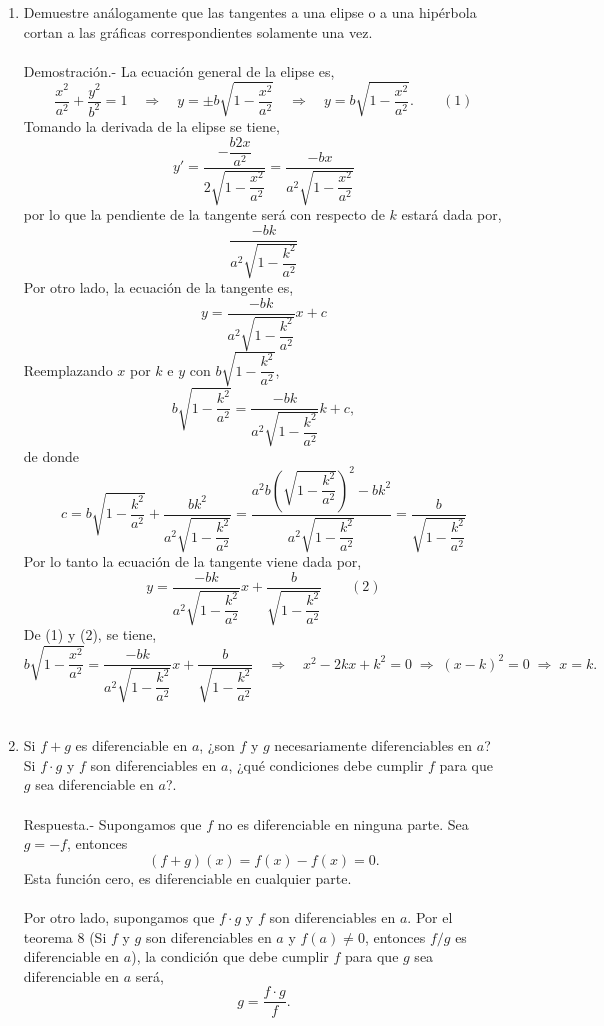 \begin{enumerate}[\bfseries 1.]
     \item Demuestre análogamente que las tangentes a una elipse o a una hipérbola cortan a las gráficas correspondientes solamente una vez.\\\\
	 Demostración.-\; La ecuación general de la elipse es,
	 $$\dfrac{x^2}{a^2}+\dfrac{y^2}{b^2}=1 \quad \Rightarrow \quad y=\pm b \sqrt{1-\dfrac{x^2}{a^2}} \quad \Rightarrow \quad y= b \sqrt{1-\dfrac{x^2}{a^2}}.\qquad (1)$$
	 Tomando la derivada de la elipse se tiene,
	 $$y'=\dfrac{-\dfrac{b2x}{a^2}}{2\sqrt{1-\dfrac{x^2}{a^2}}}=\dfrac{-bx}{a^2\sqrt{1-\dfrac{x^2}{a^2}}}$$
	 por lo que la pendiente de la tangente será con respecto de $k$ estará dada por,
	 $$\dfrac{-bk}{a^2\sqrt{1-\dfrac{k^2}{a^2}}}$$
	 Por otro lado, la ecuación de la tangente es,
	 $$y=\dfrac{-bk}{a^2\sqrt{1-\dfrac{k^2}{a^2}}}x+c$$
	 Reemplazando $x$ por $k$ e $y$ con $b\sqrt{1-\dfrac{k^2}{a^2}}$,
	 $$b\sqrt{1-\dfrac{k^2}{a^2}}=\dfrac{-bk}{a^2\sqrt{1-\dfrac{k^2}{a^2}}}k+c,$$
	 de donde 
	 $$c=b\sqrt{1-\dfrac{k^2}{a^2}}+\dfrac{bk^2}{a^2\sqrt{1-\dfrac{k^2}{a^2}}}=\dfrac{a^2 b\left(\sqrt{ 1-\dfrac{k^2}{a^2}}\right)^2 - bk^2}{a^2 \sqrt{ 1- \dfrac{k^2}{a^2}} }=\dfrac{b}{\sqrt{1-\dfrac{k^2}{a^2}}}$$
	 Por lo tanto la ecuación de la tangente viene dada por,
	 $$y=\dfrac{-bk}{a^2\sqrt{1-\dfrac{k^2}{a^2}}}x+\dfrac{b}{\sqrt{1-\dfrac{k^2}{a^2}}}\qquad (2)$$
	 De (1) y (2), se tiene,
	 $$b\sqrt{1-\dfrac{x^2}{a^2}}=\dfrac{-bk}{a^2\sqrt{1-\dfrac{k^2}{a^2}}} x + \dfrac{b}{\sqrt{1-\dfrac{k^2}{a^2}}}\quad \Rightarrow \quad x^2-2kx+k^2=0\; \Rightarrow \; (x-k)^2=0\; \Rightarrow \; x=k.$$\\

     \item Si $f+g$ es diferenciable en $a$, ¿son $f$ y $g$ necesariamente diferenciables en $a$? Si $f\cdot g$ y $f$ son diferenciables en $a$, ¿qué condiciones debe cumplir $f$ para que $g$ sea diferenciable en $a$?.\\\\
	 Respuesta.-\; Supongamos que $f$ no es diferenciable en ninguna parte. Sea $g=-f$, entonces  
	 $$(f+g)(x)=f(x)-f(x)=0.$$
	 Esta función cero, es diferenciable en cualquier parte.\\\\
	 Por otro lado, supongamos que $f\cdot g$ y $f$ son diferenciables en $a$. Por el teorema 8 (Si $f$ y $g$ son diferenciables en $a$ y $f(a)\neq 0$, entonces $f/g$ es diferenciable en $a$), la condición que debe cumplir $f$ para que $g$ sea diferenciable en $a$ será, 
	 $$g=\dfrac{f\cdot g}{f}.$$\\


\end{enumerate}
